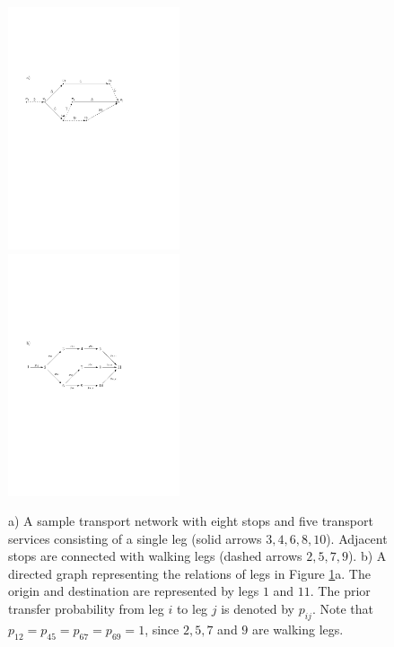 \documentclass[dissertation,draft*]{aaltoseries}
\begin{document}
\begin{figure}[ht]
\begin{center}
\includegraphics[width=0.45\textwidth]{walking01}
\ \ \ \ \ \ \ 
\includegraphics[width=0.45\textwidth]{walking01c}
\end{center}
\caption{a) A sample transport network with eight stops and five 
transport services consisting of a single leg (solid arrows $3,4,6,8,10$).
Adjacent stops are connected with walking legs (dashed arrows $2,5,7,9$).
b) A directed graph representing the relations of legs in Figure \ref{walking01}a. 
The origin and destination are represented by legs $1$ and $11$. 
The prior transfer probability from leg $i$ to leg $j$  is denoted by $p_{ij}$.
Note that $p_{12}=p_{45}=p_{67}=p_{69}=1$, since $2,5,7$ and $9$ are walking legs.
}
\label{walking01}
\end{figure}
\end{document}
